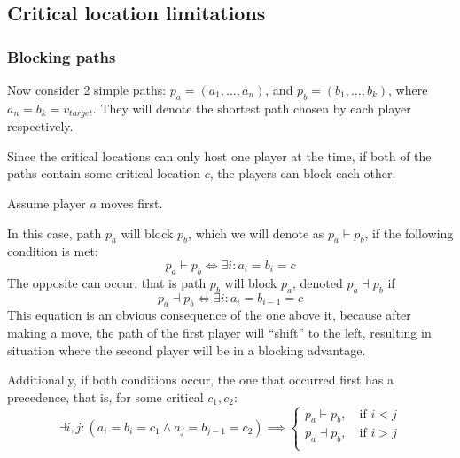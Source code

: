 \documentclass[12pt]{article}
\newcommand*{\target}{\ensuremath{v_{target}}}
\newcommand*{\blocks}{\vdash}
\newcommand*{\blockedBy}{\dashv}
\begin{document}
\subsection{Critical location limitations}

\subsubsection{Blocking paths}

Now consider 2 simple paths: $p_a = (a_1, \ldots, a_n)$, and $p_b = (b_1, \ldots, b_k)$, where $a_n = b_k = \target$.
They will denote the shortest path chosen by each player respectively.

Since the critical locations can only host one player at the time,
if both of the paths contain some critical location $c$, the players can block each other.

Assume player $a$ moves first.

In this case, path $p_a$ will block $p_b$, which we will denote as $p_a \blocks p_b$, if the following condition is met:
\begin{equation}
    p_a \blocks p_b \iff \exists i : a_i = b_i = c
\end{equation}
The opposite can occur, that is path $p_b$ will block $p_a$, denoted $p_a \blockedBy p_b$ if
\begin{equation}
    p_a \blockedBy p_b \iff \exists i : a_i = b_{i-1} = c
\end{equation}
This equation is an obvious consequence of the one above it, because after making a move, the path of the first player will ``shift'' to the left,
resulting in situation where the second player will be in a blocking advantage.

Additionally, if both conditions occur,
the one that occurred first has a precedence,
that is, for some critical $c_1, c_2$:
\begin{equation}
    \exists i,j : (a_i = b_i = c_1 \land a_j = b_{j-1} = c_2) \implies
    \begin{cases}
        p_a \blocks p_b, \quad \text{if $i < j$}    \\
        p_a \blockedBy p_b, \quad \text{if $i > j$} \\
    \end{cases}
\end{equation}
\end{document}

